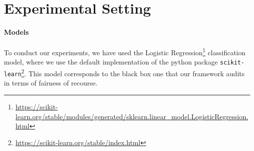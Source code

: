 \documentclass{article}
\begin{document}



\newpage
\appendix
% 



\section{Experimental Setting}\label{sec:exp-setting}



\paragraph{Models}
To conduct our experiments, we have used the Logistic Regression\footnote{\url{https://scikit-learn.org/stable/modules/generated/sklearn.linear\_model.LogisticRegression.html}} classification model, where we use the default implementation of the python package \verb|scikit-learn|\footnote{\url{https://scikit-learn.org/stable/index.html}}. This model corresponds to the black box one that our framework audits in terms of fairness of recourse.


\end{document}
